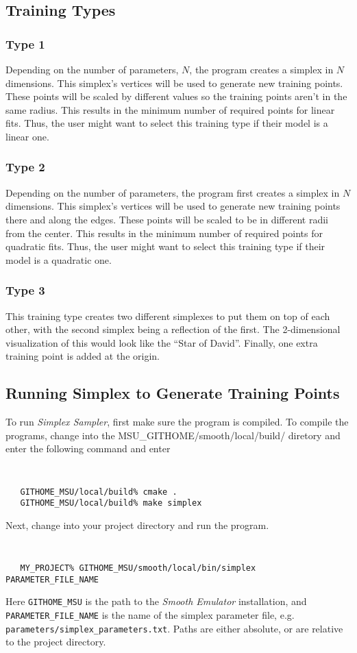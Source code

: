 \documentclass[main.tex]{subfiles}
\begin{document}
\subsection{Training Types}

\subsubsection{Type 1}
 Depending on the number of parameters, $N$, the program creates a simplex in $N$ dimensions. This simplex's vertices will be used to generate new training points. These points will be scaled by different values so the training points aren't in the same radius. This results in the minimum number of required points for linear fits. Thus, the user might want to select this training type if their model is a linear one. 

\subsubsection{Type 2}

 Depending on the number of parameters, the program first creates a simplex in $N$ dimensions. This simplex's vertices will be used to generate new training points there and along the edges. These points will be scaled to be in different radii from the center. This results in the minimum number of required points for quadratic fits. Thus, the user might want to select this training type if their model is a quadratic one.
 
\subsubsection{Type 3}
This training type creates two different simplexes to put them on top of each other, with the second simplex being a reflection of the first. The 2-dimensional visualization of this would look like the ``Star of David''.  Finally, one extra training point is added at the origin.

\subsection{Running Simplex to Generate Training Points}

To run {\it Simplex Sampler}, first make sure the program is compiled. To compile the programs, change into the {MSU\_GITHOME/smooth/local/build/} diretory and enter the following command and enter
{\tt
\begin{verbatim}
   GITHOME_MSU/local/build% cmake .
   GITHOME_MSU/local/build% make simplex
\end{verbatim}
}
Next, change into your project directory and run the program.
{\tt
\begin{verbatim}
   MY_PROJECT% GITHOME_MSU/smooth/local/bin/simplex PARAMETER_FILE_NAME
\end{verbatim}
}
Here {\tt GITHOME\_MSU} is the path to the {\it Smooth Emulator} installation, and {\tt PARAMETER\_FILE\_NAME} is the name of the simplex parameter file, e.g. {\tt parameters/simplex\_parameters.txt}. Paths are either absolute, or are relative to the project directory. 
\end{document}
